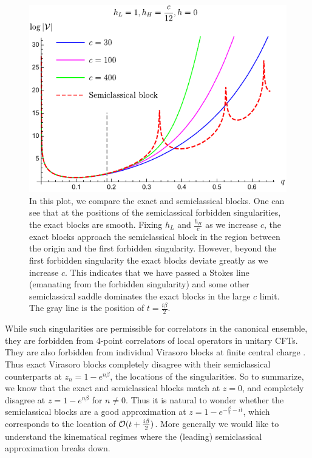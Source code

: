\begin{figure}[t]
\centering{}\includegraphics[]{virasoro_chapter/forbiddensingularity}
\caption[Breakdown of semiclassical approximation in Euclidean time]{In this plot, we compare the exact and semiclassical blocks. One can see that at the positions of the semiclassical forbidden singularities, the exact blocks are smooth. Fixing $h_L$ and $\frac{h_H}{c}$ as we increase $c$, the exact blocks approach the semiclassical block in the region between the origin and the first forbidden singularity.  However, beyond the first forbidden singularity the exact blocks deviate greatly as we increase $c$.  This indicates that we have passed a Stokes line (emanating from the forbidden singularity) and some other semiclassical saddle dominates the exact blocks in the large $c$ limit.  The gray line is the position of $t =  \frac{i \beta}{2}$.}
\label{fig:forbidden}
\end{figure}

While such singularities are permissible for correlators in the canonical ensemble, they are forbidden \cite{Maldacena:2015iua, Fitzpatrick:2016ive} from 4-point correlators of local operators in unitary CFTs.  They are also forbidden from individual Virasoro blocks at finite central charge \cite{Fitzpatrick:2016ive, Fitzpatrick:2016mjq}.  Thus exact Virasoro blocks completely disagree with their semiclassical counterparts at $z_n = 1 - e^{n \beta}$, the locations of the singularities.  So to summarize, we know that the exact and semiclassical blocks match at $z = 0$, and completely disagree at $z = 1 - e^{n \beta}$ for $n \neq 0$.  Thus it is natural to wonder whether the semiclassical blocks are a good approximation at $z = 1 - e^{-\frac{\beta}{2} -it}$, which corresponds to the location of ${\cal O}(t + \frac{i \beta}{2})$.  More generally we would like to understand the kinematical regimes where the (leading) semiclassical approximation breaks down.



